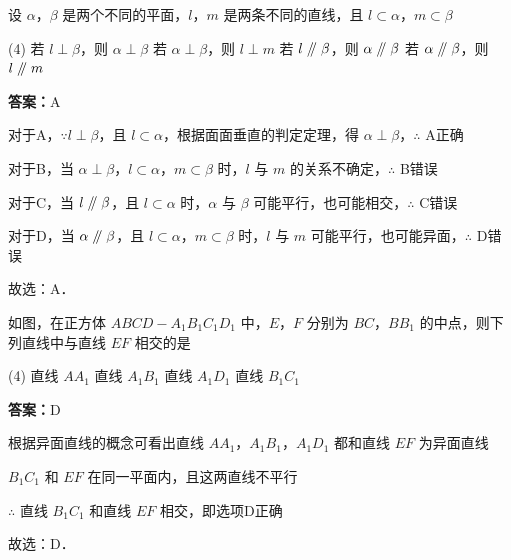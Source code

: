 \vspace{2em}
\begin{example}[\bkstar{2}{5}]
设 $\alpha$，$\beta$ 是两个不同的平面，$l$，$m$ 是两条不同的直线，且 $l\subset\alpha$，$m\subset\beta$
\begin{tasks}(4)
    \task 若 $l\perp\beta$，则 $\alpha\perp\beta$
    \task 若 $\alpha\perp\beta$，则 $l\perp m$
    \task 若 $l\mathrel{/\mkern-5mu/}\beta$，则 $\alpha\mathrel{/\mkern-5mu/}\beta$
    \task 若 $\alpha\mathrel{/\mkern-5mu/}\beta$，则 $l\mathrel{/\mkern-5mu/} m$
\end{tasks}
\end{example}
\begin{solution}
\textbf{答案：}A

对于A，$\because l\perp\beta$，且 $l\subset\alpha$，根据面面垂直的判定定理，得 $\alpha\perp\beta$，$\therefore$ A正确

对于B，当 $\alpha\perp\beta$，$l\subset\alpha$，$m\subset\beta$ 时，$l$ 与 $m$ 的关系不确定，$\therefore$ B错误

对于C，当 $l\mathrel{/\mkern-5mu/}\beta$，且 $l\subset\alpha$ 时，$\alpha$ 与 $\beta$ 可能平行，也可能相交，$\therefore$ C错误

对于D，当 $\alpha\mathrel{/\mkern-5mu/}\beta$，且 $l\subset\alpha$，$m\subset\beta$ 时，$l$ 与 $m$ 可能平行，也可能异面，$\therefore$ D错误

故选：A．
\end{solution}

\vspace{2em}

\begin{example}[\bkstar{2}{5}]
如图，在正方体 $ABCD-A_1B_1C_1D_1$ 中，$E$，$F$ 分别为 $BC$，$BB_1$ 的中点，则下列直线中与直线 $EF$ 相交的是
\begin{tasks}(4)
    \task 直线 $AA_1$
    \task 直线 $A_1B_1$
    \task 直线 $A_1D_1$
    \task 直线 $B_1C_1$
\end{tasks}
\end{example}
\begin{solution}
\textbf{答案：}D

根据异面直线的概念可看出直线 $AA_1$，$A_1B_1$，$A_1D_1$ 都和直线 $EF$ 为异面直线

$B_1C_1$ 和 $EF$ 在同一平面内，且这两直线不平行

$\therefore$ 直线 $B_1C_1$ 和直线 $EF$ 相交，即选项D正确

故选：D．
\end{solution}


